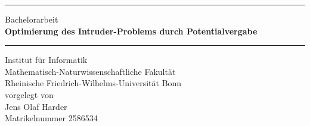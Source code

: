 
\begin{titlepage}

\renewcommand{\baselinestretch}{2}\normalsize


\rule{\textwidth}{0.4pt}

\vspace{1cm}

\begin{center}
    {\LARGE Bachelorarbeit} \\
    \textbf{\Huge Optimierung des Intruder-Problems durch Potentialvergabe}
\end{center}

\vspace{1cm}
\rule{\textwidth}{0.4pt}
\vspace{0.5cm}

\begin{center}

    \vspace{0.5cm}
    Institut für Informatik \\
    Mathematisch-Naturwissenschaftliche Fakultät \\
    Rheinische Friedrich-Wilhelms-Universität Bonn \\[0.5cm]
    vorgelegt von \\
    \vspace{0.5cm}
    {\Large Jens Olaf Harder} \\
    Matrikelnummer  2586534 \\
\end{center}


%
%


\end{titlepage}
